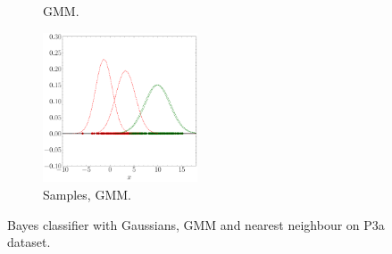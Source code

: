 \documentclass[12pt, a4 paper]{article}
\begin{document}
\begin{figure}[!htbp]
\begin{subfigure}[!htbp]{0.24\textwidth}
       \caption{GMM.}
       \label{fig:GMM_P3a}
    \end{subfigure}
\quad \quad
    \begin{subfigure}[!htbp]{0.24\textwidth}
       \centering
       \includegraphics[width=1.8in]{../results/ex3/samples_GMM_EM_dataset_P3a_size_199.pdf}
       \caption{Samples, GMM.}
       \label{fig:GMM_DF_P3a}
    \end{subfigure}
\caption{Bayes classifier with Gaussians, GMM and nearest neighbour on P3a dataset.}
\label{fig:ex3P3a}
\end{figure}
\end{document}
